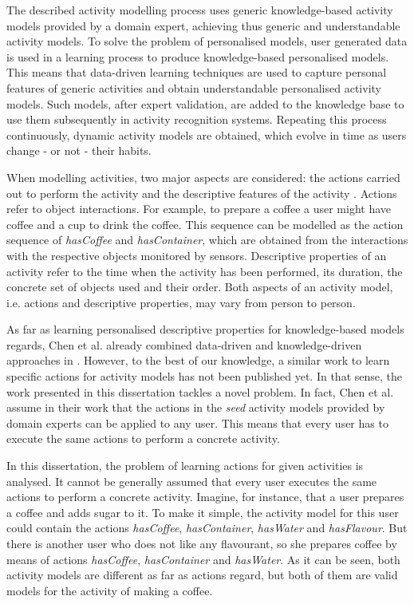 The described activity modelling process uses generic knowledge-based activity models provided by a domain expert, achieving thus generic and understandable activity models. To solve the problem of personalised models, user generated data is used in a learning process to produce knowledge-based personalised models. This means that data-driven learning techniques are used to capture personal features of generic activities and obtain understandable personalised activity models. Such models, after expert validation, are added to the knowledge base to use them subsequently in activity recognition systems. Repeating this process continuously, dynamic activity models are obtained, which evolve in time as users change - or not - their habits.


When modelling activities, two major aspects are considered: the actions carried out to perform the activity and the descriptive features of the activity \cite{Chen2014}. Actions refer to object interactions. For example, to prepare a coffee a user might have coffee and a cup to drink the coffee. This sequence can be modelled as the action sequence of \textit{hasCoffee} and \textit{hasContainer}, which are obtained from the interactions with the respective objects monitored by sensors. Descriptive properties of an activity refer to the time when the activity has been performed, its duration, the concrete set of objects used and their order. Both aspects of an activity model, i.e. actions and descriptive properties, may vary from person to person. 

As far as learning personalised descriptive properties for knowledge-based models regards, Chen et al. already combined data-driven and knowledge-driven approaches in \cite{Chen2014}. However, to the best of our knowledge, a similar work to learn specific actions for activity models has not been published yet. In that sense, the work presented in this dissertation tackles a novel problem. In fact, Chen et al. assume in their work that the actions in the \textit{seed} activity models provided by domain experts can be applied to any user. This means that every user has to execute the same actions to perform a concrete activity.

In this dissertation, the problem of learning actions for given activities is analysed. It cannot be generally assumed that every user executes the same actions to perform a concrete activity. Imagine, for instance, that a user prepares a coffee and adds sugar to it. To make it simple, the activity model for this user could contain the actions \textit{hasCoffee}, \textit{hasContainer}, \textit{hasWater} and \textit{hasFlavour}. But there is another user who does not like any flavourant, so she prepares coffee by means of actions \textit{hasCoffee}, \textit{hasContainer} and  \textit{hasWater}. As it can be seen, both activity models are different as far as actions regard, but both of them are valid models for the activity of making a coffee. 

